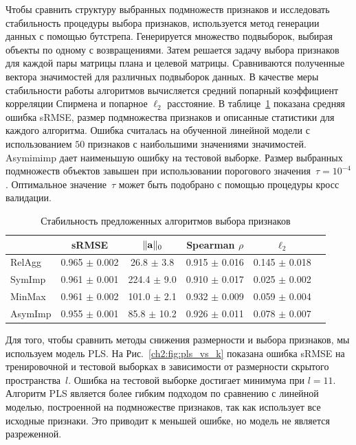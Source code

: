 Чтобы сравнить структуру выбранных подмножеств признаков и исследовать стабильность процедуры выбора признаков, используется метод генерации данных с помощью бутстрепа. 
Генерируется множество подвыборок, выбирая объекты по одному с возвращениями. 
Затем решается задачу выбора признаков для каждой пары матрицы плана и целевой матрицы.
Сравниваются полученные вектора значимостей для различных подвыборок данных. 
В качестве меры стабильности работы алгоритмов вычисляется средний попарный коэффициент корреляции Спирмена и попарное $\ell_2$ расстояние.
В таблице~\ref{ch2:tbl:stability} показана средняя ошибка sRMSE, размер подмножества признаков и описанные статистики для каждого алгоритма. 
Ошибка считалась на обученной линейной модели с использованием $50$ признаков с наибольшими значениями значимостей.
Asymimimp дает наименьшую ошибку на тестовой выборке. 
Размер выбранных подмножеств объектов завышен при использовании порогового значения~$\tau=10^{-4}$. 
Оптимальное значение~$\tau$ может быть подобрано с помощью процедуры кросс валидации.

\begin{table}[ht]
	\caption{Стабильность предложенных алгоритмов выбора признаков}
	\centering
	\begin{tabular}{l|ccccc}
		\hline
		& sRMSE  & $\|\mathbf{a}\|_0$ & Spearman $\rho$ & $\ell_2$ \\ \hline
		RelAgg & 0.965 $\pm$ 0.002 & 26.8 $\pm$ 3.8 & 0.915 $\pm$ 0.016 & 0.145 $\pm$ 0.018   \\
		SymImp & 0.961 $\pm$ 0.001 & 224.4 $\pm$ 9.0 & 0.910 $\pm$ 0.017 & 0.025 $\pm$ 0.002   \\
		MinMax & 0.961 $\pm$ 0.002 & 101.0 $\pm$ 2.1& 0.932 $\pm$ 0.009 & 0.059 $\pm$ 0.004   \\
		AsymImp & 0.955 $\pm$ 0.001 & 85.8 $\pm$ 10.2& 0.926 $\pm$ 0.011 & 0.078 $\pm$ 0.007  \\ \hline
	\end{tabular}
	\label{ch2:tbl:stability}
\end{table}

Для того, чтобы сравнить методы снижения размерности и выбора признаков, мы используем модель PLS. 
На Рис.~\ref{ch2:fig:pls_vs_k} показана ошибка sRMSE на тренировочной и тестовой выборках в зависимости от размерности скрытого пространства~$l$.
Ошибка на тестовой выборке достигает минимума при $l = 11$.
Алгоритм PLS является более гибким подходом по сравнению с линейной моделью, построенной на подмножестве признаков, так как использует все исходные признаки.
Это приводит к меньшей ошибке, но модель не является разреженной.

